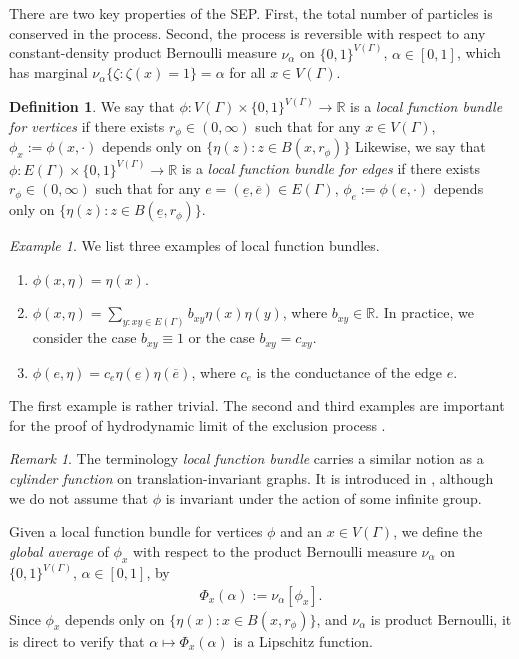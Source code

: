 \documentclass[11pt]{amsart}
\theoremstyle{plain}
\theoremstyle{definition}
\newtheorem{definition}[lemma]{Definition}
\theoremstyle{remark}
\newtheorem{remark}[lemma]{Remark}
\newtheorem{example}[lemma]{Example}
\begin{document}
There are two key properties of the SEP. First, the total number of particles is conserved in the process. Second, the process is reversible with respect to any constant-density product Bernoulli measure $\nu_\alpha$ on $\{0,1\}^{V(\Gamma)}$, $\alpha\in [0,1]$, which has marginal $\nu_\alpha\{\zeta: \zeta(x)=1\}=\alpha
$ for all $x\in V(\Gamma)$. 

\begin{definition}
We say that $\phi: V(\Gamma) \times \{0,1\}^{V(\Gamma)} \to \mathbb{R}$ is a \emph{local function bundle for vertices} if there exists $r_\phi \in (0,\infty)$ such that for any $x\in V(\Gamma)$, $\phi_x :=\phi(x,\cdot)$ depends only on $\{\eta(z): z\in B(x,r_\phi)\}$ Likewise, we say that $\phi: E(\Gamma) \times \{0,1\}^{V(\Gamma)} \to \mathbb{R}$ is a \emph{local function bundle for edges} if there exists $r_\phi\in (0,\infty)$ such that for any $e= (\underline{e},\overline{e}) \in E(\Gamma)$, $\phi_e:= \phi(e,\cdot)$ depends only on $\{\eta(z) : z\in B(\underline{e}, r_\phi)\}$.
\end{definition}

\begin{example}
We list three examples of local function bundles.
\begin{enumerate}
\item $\phi(x,\eta) = \eta(x)$.
\item $\phi(x,\eta) = \sum_{y: xy\in E(\Gamma)} b_{xy} \eta(x)\eta(y)$, where $b_{xy} \in \mathbb{R}$. In practice, we consider the case $b_{xy} \equiv 1$ or the case $b_{xy}= c_{xy}$.
\item $\phi(e,\eta) = c_e \eta(\underline{e})\eta(\overline{e})$, where $c_e$ is the conductance of the edge $e$.
\end{enumerate}
The first example is rather trivial. The second and third examples are important for the proof of hydrodynamic limit of the exclusion process \cite{GPV88, KOV89, KipnisLandim}.
\end{example}

\begin{remark}
The terminology \emph{local function bundle} carries a similar notion as a \emph{cylinder function} on translation-invariant graphs. It is introduced in \cite{Tanaka}, although we do not assume that $\phi$ is invariant under the action of some infinite group. 
\end{remark}

Given a local function bundle for vertices $\phi$ and an $x\in V(\Gamma)$, we define the \emph{global average} of $\phi_x$ with respect to the product Bernoulli measure $\nu_\alpha$ on $\{0,1\}^{V(\Gamma)}$, $\alpha\in [0,1]$, by
\begin{align}
\Phi_x(\alpha) := \nu_\alpha[\phi_x].
 \end{align}
Since $\phi_x$ depends only on $\{\eta(x): x\in B(x,r_\phi)\}$, and $\nu_\alpha$ is product Bernoulli, it is direct to verify that $\alpha\mapsto \Phi_x(\alpha)$ is a Lipschitz function. 
\end{document}
